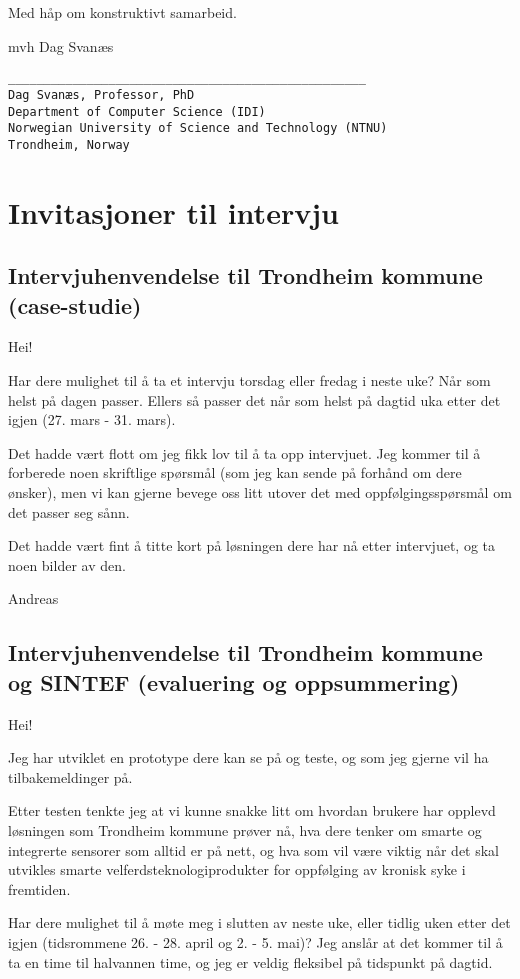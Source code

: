 Med håp om konstruktivt samarbeid.

mvh
Dag Svanæs

\begin{verbatim}
__________________________________________________
Dag Svanæs, Professor, PhD
Department of Computer Science (IDI)
Norwegian University of Science and Technology (NTNU)
Trondheim, Norway
\end{verbatim}


\chapter{Invitasjoner til intervju}
\label{appendix:invitasjon_evaluering}

\section{Intervjuhenvendelse til Trondheim kommune (case-studie)}
Hei!

Har dere mulighet til å ta et intervju torsdag eller fredag i neste uke? Når som helst på dagen passer. 
Ellers så passer det når som helst på dagtid uka etter det igjen (27. mars - 31. mars).

Det hadde vært flott om jeg fikk lov til å ta opp intervjuet. Jeg kommer til å forberede noen skriftlige spørsmål
(som jeg kan sende på forhånd om dere ønsker),
men vi kan gjerne bevege oss litt utover det med oppfølgingsspørsmål om det passer seg sånn. 

Det hadde vært fint å titte kort på løsningen dere har nå etter intervjuet, og ta noen bilder av den.

Andreas

\section{Intervjuhenvendelse til Trondheim kommune og SINTEF (evaluering og oppsummering)}
Hei! 

Jeg har utviklet en prototype dere kan se på og teste, og som jeg gjerne vil ha tilbakemeldinger på.

Etter testen tenkte jeg at vi kunne snakke litt om hvordan brukere har opplevd løsningen som Trondheim kommune prøver nå, hva dere tenker om smarte
og integrerte sensorer som alltid er på nett, og hva som vil være viktig når det skal utvikles smarte velferdsteknologiprodukter for oppfølging av
kronisk syke i fremtiden.

Har dere mulighet til å møte meg i slutten av neste uke, eller tidlig uken etter det igjen (tidsrommene 26. - 28. april og 2. - 5. mai)? Jeg anslår
at det kommer til å ta en time til halvannen time, og jeg er veldig fleksibel på tidspunkt på dagtid. 

